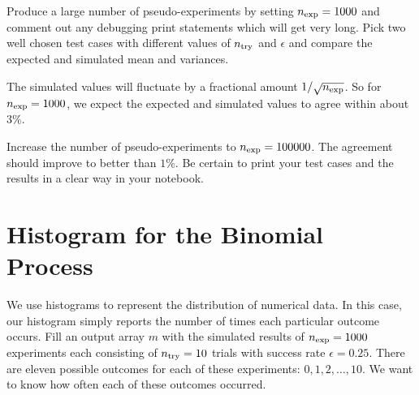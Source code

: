 \begin{plot}
Produce a large number of pseudo-experiments by setting $n_{\rm exp} =
1000$ and comment out any debugging print statements which will get
very long.  Pick two  well chosen test cases with different values of
$n_{\rm try}$ and $\epsilon$ and compare the expected and simulated
mean and variances. 
\end{plot}


The simulated values will fluctuate by a
fractional amount $1/\sqrt{n_{\rm exp}}$.  So for $n_{\rm exp} =
1000$, we expect the expected and simulated values to agree within
about $3\%$.

\begin{plot}
Increase the number of pseudo-experiments to $n_{\rm exp} = 100000$.
The agreement should improve to better than $1\%$.  Be certain to
print your test cases and the results in a clear way in your notebook.
\end{plot}

\section{Histogram for the Binomial Process}

We use histograms to represent the distribution of numerical data.  In
this case, our histogram simply reports the number of times each particular outcome
occurs.  Fill an output array $m$ with the simulated results of $n_{\rm exp} =
1000$ experiments each consisting of $n_{\rm try}=10$ trials with
success rate $\epsilon=0.25$.  There are eleven possible outcomes for
each of these experiments: $0,1,2,\ldots,10$.  We want to know how
often each of these outcomes occurred.

